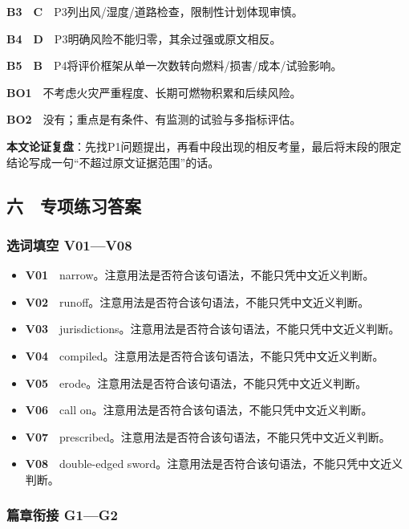 \documentclass[
  11pt,
]{ctexart}
\begin{document}
\textbf{B3　C}　P3列出风/湿度/道路检查，限制性计划体现审慎。

\textbf{B4　D}　P3明确风险不能归零，其余过强或原文相反。

\textbf{B5　B}　P4将评价框架从单一次数转向燃料/损害/成本/试验影响。

\textbf{BO1}　不考虑火灾严重程度、长期可燃物积累和后续风险。

\textbf{BO2}　没有；重点是有条件、有监测的试验与多指标评估。

\textbf{本文论证复盘}：先找P1问题提出，再看中段出现的相反考量，最后将末段的限定结论写成一句``不超过原文证据范围''的话。

\subsection{六　专项练习答案}\label{ux516d-ux4e13ux9879ux7ec3ux4e60ux7b54ux6848}

\subsubsection{选词填空
V01---V08}\label{ux9009ux8bcdux586bux7a7a-v01v08}

\begin{itemize}
\item
  \textbf{V01}　narrow。注意用法是否符合该句语法，不能只凭中文近义判断。
\item
  \textbf{V02}　runoff。注意用法是否符合该句语法，不能只凭中文近义判断。
\item
  \textbf{V03}　jurisdictions。注意用法是否符合该句语法，不能只凭中文近义判断。
\item
  \textbf{V04}　compiled。注意用法是否符合该句语法，不能只凭中文近义判断。
\item
  \textbf{V05}　erode。注意用法是否符合该句语法，不能只凭中文近义判断。
\item
  \textbf{V06}　call
  on。注意用法是否符合该句语法，不能只凭中文近义判断。
\item
  \textbf{V07}　prescribed。注意用法是否符合该句语法，不能只凭中文近义判断。
\item
  \textbf{V08}　double-edged
  sword。注意用法是否符合该句语法，不能只凭中文近义判断。
\end{itemize}

\subsubsection{篇章衔接 G1---G2}\label{ux7bc7ux7ae0ux8854ux63a5-g1g2}
\end{document}
